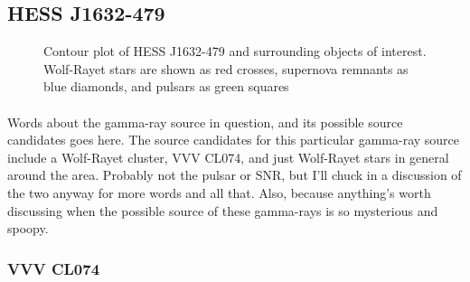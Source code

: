 \documentclass[a4paper, titlepage, oneside]{article}
\begin{document}
\begin{multicols}{2}
\subsection{HESS J1632-479}

\begin{figure}[H]
  \centering
  \caption{Contour plot of HESS J1632-479 and surrounding objects of interest. Wolf-Rayet stars are shown as red crosses, supernova remnants as blue diamonds, and pulsars as green squares}
  \label{fig:hess32}
\end{figure}

\paragraph{}
Words about the gamma-ray source in question, and its possible source candidates goes here. The source candidates for this particular gamma-ray source include a Wolf-Rayet cluster, VVV CL074, and just Wolf-Rayet stars in general around the area. Probably not the pulsar or SNR, but I'll chuck in a discussion of the two anyway for more words and all that. Also, because anything's worth discussing when the possible source of these gamma-rays is so mysterious and spoopy.

\subsubsection{VVV CL074}

\end{multicols}
\end{document}

